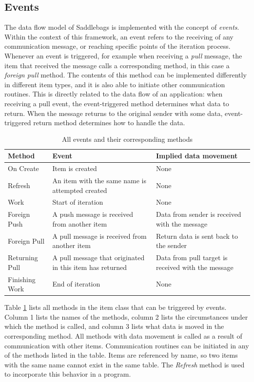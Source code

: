 \documentclass{uit-report}
\begin{document}
\subsection{Events} \label{section:events}
The data flow model of Saddlebags is implemented with the concept of \emph{events}. Within the context of this framework, an event refers to the receiving of any communication message, or reaching specific points of the iteration process. Whenever an event is triggered, for example when receiving a \emph{pull} message, the item that received the message calls a corresponding method, in this case a \emph{foreign pull} method. The contents of this method can be implemented differently in different item types, and it is also able to initiate other communication routines. This is directly related to the data flow of an application: when receiving a pull event, the event-triggered method determines what data to return. When the message returns to the original sender with some data, event-triggered return method determines how to handle the data. 

\begin{table}
\setlength\arrayrulewidth{1pt}
\renewcommand{\arraystretch}{2}
\begin{tabular}{ | p{3cm} | p{6cm} | p{6cm} |}
   	\hline
   	\textbf{Method} & \textbf{Event} & \textbf{Implied data movement} \\ \hline
   	On Create & Item is created & None\\ \hline
  	Refresh & An item with the same name is attempted created & None \\ \hline
  	Work & Start of iteration & None \\ \hline
   	Foreign Push & A push message is received from another item & Data from sender is received with the message  \\ \hline
   	Foreign Pull & A pull message is received from another item & Return data is sent back to the sender\\ \hline
	Returning Pull & A pull message that originated in this item has returned & Data from pull target is received with the message\\ \hline
	Finishing Work & End of iteration & None\\ \hline

\end{tabular}
\caption{All events and their corresponding methods}
\label{table:events}
\end{table}

Table \ref{table:events} lists all methods in the item class that can be triggered by events. Column 1 lists the names of the methods, column 2 lists the circumstances under which the method is called, and column 3 lists what data is moved in the corresponding method. All methods with data movement is called as a result of communication with other items. Communication routines can be initiated in any of the methods listed in the table. Items are referenced by name, so two items with the same name cannot exist in the same table. The \emph{Refresh} method is used to incorporate this behavior in a program.
\end{document}
